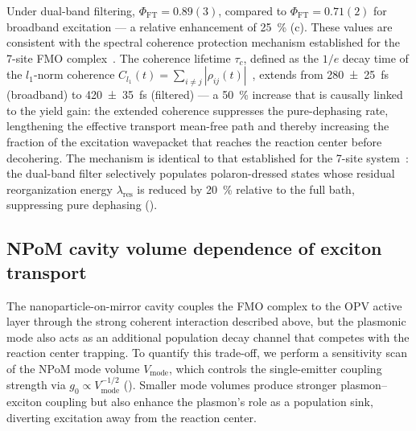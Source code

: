 \documentclass[preprint,12pt]{elsarticle}
\begin{document}
Under dual-band filtering, $\Phi_{\mathrm{FT}} = 0.89(3)$, compared to $\Phi_{\mathrm{FT}} = 0.71(2)$ for broadband excitation --- a relative enhancement of \qty{25}{\percent} (c). These values are consistent with the spectral coherence protection mechanism established for the 7-site FMO complex~\cite{Kouam2026}.
The coherence lifetime $\tau_c$, defined as the $1/e$ decay time of the $l_1$-norm coherence $C_{l_1}(t) = \sum_{i\neq j} |\rho_{ij}(t)|$~\cite{Baumgratz2014}, extends from \qty{280(25)}{\fs} (broadband) to \qty{420(35)}{\fs} (filtered) --- a \qty{50}{\percent} increase that is causally linked to the yield gain: the extended coherence suppresses the pure-dephasing rate, lengthening the effective transport mean-free path and thereby increasing the fraction of the excitation wavepacket that reaches the reaction center before decohering.
The mechanism is identical to that established for the 7-site system~\cite{Kouam2026}: the dual-band filter selectively populates polaron-dressed states whose residual reorganization energy $\lambda_{\mathrm{res}}$ is reduced by \qty{20}{\percent} relative to the full bath, suppressing pure dephasing ().

\subsection*{NPoM cavity volume dependence of exciton transport}

The nanoparticle-on-mirror cavity couples the FMO complex to the OPV active layer through the strong coherent interaction described above, but the plasmonic mode also acts as an additional population decay channel that competes with the reaction center trapping.
To quantify this trade-off, we perform a sensitivity scan of the NPoM mode volume $V_{\mathrm{mode}}$, which controls the single-emitter coupling strength via $g_0 \propto V_{\mathrm{mode}}^{-1/2}$ ().
Smaller mode volumes produce stronger plasmon--exciton coupling but also enhance the plasmon's role as a population sink, diverting excitation away from the reaction center.
\end{document}
